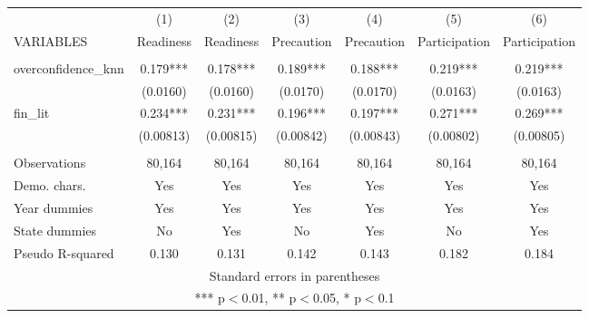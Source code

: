 \documentclass[]{article}
\begin{document}
\begin{tabular}{lcccccc} \hline
 & (1) & (2) & (3) & (4) & (5) & (6) \\
VARIABLES & Readiness & Readiness & Precaution & Precaution & Participation & Participation \\ \hline
 &  &  &  &  &  &  \\
overconfidence\_knn & 0.179*** & 0.178*** & 0.189*** & 0.188*** & 0.219*** & 0.219*** \\
 & (0.0160) & (0.0160) & (0.0170) & (0.0170) & (0.0163) & (0.0163) \\
fin\_lit & 0.234*** & 0.231*** & 0.196*** & 0.197*** & 0.271*** & 0.269*** \\
 & (0.00813) & (0.00815) & (0.00842) & (0.00843) & (0.00802) & (0.00805) \\
 &  &  &  &  &  &  \\
Observations & 80,164 & 80,164 & 80,164 & 80,164 & 80,164 & 80,164 \\
Demo. chars. & Yes & Yes & Yes & Yes & Yes & Yes \\
Year dummies & Yes & Yes & Yes & Yes & Yes & Yes \\
State dummies & No & Yes & No & Yes & No & Yes \\
 Pseudo R-squared & 0.130 & 0.131 & 0.142 & 0.143 & 0.182 & 0.184 \\ \hline
\multicolumn{7}{c}{ Standard errors in parentheses} \\
\multicolumn{7}{c}{ *** p$<$0.01, ** p$<$0.05, * p$<$0.1} \\
\end{tabular}
\end{document}
